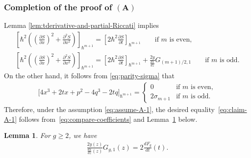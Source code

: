 \documentclass[11pt]{article}
\newtheorem{lem}[thm]{Lemma}
\theoremstyle{definition}
\numberwithin{equation}{section}
\def\p{\partial}
\begin{document}
\subsubsection[Completion of the proof of $(A)$]{Completion of the proof of $\boldsymbol{(A)}$}
\label{subsec:proof-A-2}

Lemma \ref{lem:tderivative-and-partial-Riccati} implies
\begin{gather}
\left[ \hbar^{2}\left( \left(\frac{\p S}{\p x}\right)^{2}
+ \frac{\p^{2} S}{\p x^{2}} \right)  \right]_{\hbar^{m+1}}
= \left[ 2\hbar^{2} \frac{\p S}{\p t} \right]_{\hbar^{m+1}}
 \qquad \text{if $m$ is even},\nonumber\\
\left[ \hbar^{2}\left( \left(\frac{\p S}{\p x}\right)^{2}
+ \frac{\p^{2} S}{\p x^{2}} \right)  \right]_{\hbar^{m+1}}
= \left[ 2\hbar^{2} \frac{\p S}{\p t} \right]_{\hbar^{m+1}}
+ \frac{2y}{\frac{dx}{dz}} G_{(m+1)/2,1}
\qquad \text{if $m$ is odd.}
\label{eq:compare-coefficients}
\end{gather}
On the other hand, it follows from \eqref{eq:parity-sigma} that
\begin{gather*}
\bigl[4x^{3}+2tx + p^{2} -4q^{3} -2 tq \bigr]_{\hbar^{m+1}}
=
\begin{cases}
0 & \text{if $m$ is even}, \\
2\sigma_{m+1} & \text{if $m$ is odd}.
\end{cases}
\end{gather*}
Therefore, under the assumption \eqref{eq:assume-A-1},
the desired equality~\eqref{eq:claim-A-1}
follows from~\eqref{eq:compare-coefficients}
and Lem\-ma~\ref{lem:Gg1} below.

\begin{lem} \label{lem:Gg1}
For $g \ge 2$, we have
\begin{gather} \label{eq:n-is-1-part-in-Ggn}
\frac{2y(z)}{\frac{dx}{dz}(z)} G_{g,1}(z) =
 2 \frac{dF_{g}}{dt}(t).
\end{gather}
\end{lem}
\end{document}
